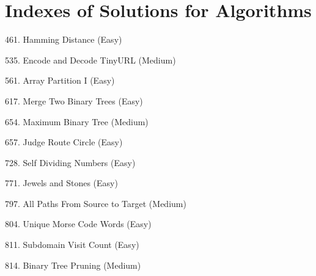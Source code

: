 \tocless\section{Indexes of Solutions for Algorithms}
\label{sec:algo_ind}

\begin{flushleft}
461. Hamming Distance (Easy)\hfill\pageref{algo:461}

535. Encode and Decode TinyURL (Medium)\hfill\pageref{algo:535}

561. Array Partition I (Easy)\hfill\pageref{algo:561}

617. Merge Two Binary Trees (Easy)\hfill\pageref{algo:617}

654. Maximum Binary Tree (Medium)\hfill\pageref{algo:654}

657. Judge Route Circle (Easy)\hfill\pageref{algo:657}

728. Self Dividing Numbers (Easy)\hfill\pageref{algo:728}

771. Jewels and Stones (Easy)\hfill\pageref{algo:771}

797. All Paths From Source to Target (Medium)\hfill\pageref{algo:797}

804. Unique Morse Code Words (Easy)\hfill\pageref{algo:804}

811. Subdomain Visit Count (Easy)\hfill\pageref{algo:811}

814. Binary Tree Pruning (Medium)\hfill\pageref{algo:814}
\end{flushleft}

\newpage
